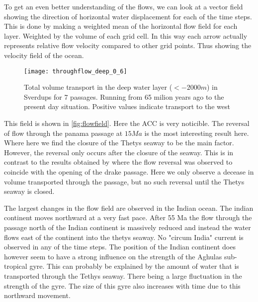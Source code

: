 To get an even better understanding of the flows, we can look at a vector field showing the direction of horizontal water displacement for each of the time steps. This is done by making a weighted mean of the horizontal flow field for each layer. Weighted by the volume of each grid cell. In this way each arrow actually represents relative flow velocity compared to other grid points. Thus showing the velocity field of the ocean. 

\begin{figure}[H]
	\texttt{[image: throughflow\_deep\_0\_6]}
	\caption{Total volume transport in the deep water layer ($<-2000m$) in Sverdups for 7 passages. Running from 65 milion years ago to the present day situation. Positive values indicate transport to the west}
	\label{fig:throughflow_bottom}
\end{figure}



This field is shown in \cref{fig:flowfield}. Here the ACC is very noticible. The reversal of flow through the panama passage at $15Ma$ is the most interesting result here.  Where here we find the closure of the Thetys seaway to be the main factor. However, the reversal only occurs after the closure of the seaway. This is in contrast to the results obtained by \cite{omta2003physical} where the flow reversal was observed to coincide with the opening of the drake passage. Here we only observe a decease in volume transported through the passage, but no such reversal until the Thetys seaway is closed.

The largest changes in the flow field are observed in the Indian ocean. The indian continent moves northward at a very fast pace. After 55 Ma the flow through the passage north of the Indian continent is massively reduced and instead the water flows east of the continent into the thetys seaway. No "circum India" current is observed in any of the time steps. The position of the Indian continent does however seem to have a strong influence on the strength of the Aghulas sub-tropical gyre. This can probably be explained by the amount of water that is transported through the Tethys seaway. There being a large fluctuation in the strength of the gyre. The size of this gyre also increases with time due to this northward movement.
